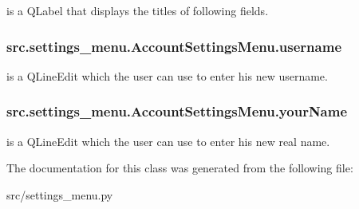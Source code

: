 is a Q\+Label that displays the titles of following fields. 

\hypertarget{classsrc_1_1settings__menu_1_1_account_settings_menu_a54d0681d7b2c05bc084bf686a5e0cf41}{}
\subsubsection[{username}]{\setlength{\rightskip}{0pt plus 5cm}src.\+settings\+\_\+menu.\+Account\+Settings\+Menu.\+username}\label{classsrc_1_1settings__menu_1_1_account_settings_menu_a54d0681d7b2c05bc084bf686a5e0cf41}


is a Q\+Line\+Edit which the user can use to enter his new username. 

\hypertarget{classsrc_1_1settings__menu_1_1_account_settings_menu_a72d6db1fc6e6253916fec2090e8ff914}{}
\subsubsection[{your\+Name}]{\setlength{\rightskip}{0pt plus 5cm}src.\+settings\+\_\+menu.\+Account\+Settings\+Menu.\+your\+Name}\label{classsrc_1_1settings__menu_1_1_account_settings_menu_a72d6db1fc6e6253916fec2090e8ff914}


is a Q\+Line\+Edit which the user can use to enter his new real name. 



The documentation for this class was generated from the following file\+:\begin{DoxyCompactItemize}
\item 
src/settings\+\_\+menu.\+py\end{DoxyCompactItemize}
